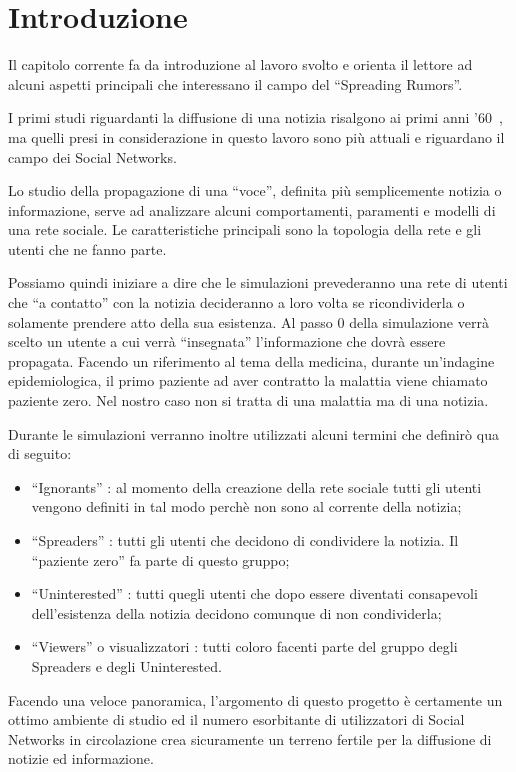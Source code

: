 \section{Introduzione}
\label{section:introduzione}

Il capitolo corrente fa da introduzione al lavoro svolto e orienta il lettore 
ad alcuni aspetti principali che interessano il campo del ``Spreading Rumors''.

I primi studi riguardanti la diffusione di una notizia risalgono ai primi anni '60~\cite{biblio:stochastic_rumours}, 
ma quelli presi in considerazione in questo lavoro sono più attuali e riguardano il campo dei Social Networks.

Lo studio della propagazione di una ``voce'', definita più semplicemente notizia o informazione, 
serve ad analizzare alcuni comportamenti, paramenti e modelli di una rete sociale.
Le caratteristiche principali sono la topologia della rete e gli utenti che ne fanno parte.

Possiamo quindi iniziare a dire che le simulazioni prevederanno una rete di utenti che ``a contatto'' con
la notizia decideranno a loro volta se ricondividerla o solamente prendere atto della sua esistenza.
Al passo 0 della simulazione verrà scelto un utente a cui verrà ``insegnata'' l'informazione 
che dovrà essere propagata. 
Facendo un riferimento al tema della medicina, durante un'indagine epidemiologica, il primo paziente ad aver 
contratto la malattia viene chiamato paziente zero.
Nel nostro caso non si tratta di una malattia ma di una notizia.

Durante le simulazioni verranno inoltre utilizzati alcuni termini che definirò qua di seguito:
\begin{itemize}
 \item ``Ignorants'' : al momento della creazione della rete sociale tutti gli utenti vengono definiti 
 in tal modo perchè non sono al corrente della notizia;
 \item ``Spreaders'' : tutti gli utenti che decidono di condividere la notizia. 
 Il ``paziente zero'' fa parte di questo gruppo;
 \item ``Uninterested'' : tutti quegli utenti che dopo essere diventati consapevoli dell'esistenza 
 della notizia decidono comunque di non condividerla;
 \item ``Viewers'' o visualizzatori : tutti coloro facenti parte del gruppo degli Spreaders e degli Uninterested.
\end{itemize}

Facendo una veloce panoramica, l'argomento di questo progetto è certamente un ottimo ambiente di studio
ed il numero esorbitante di utilizzatori di Social Networks in circolazione crea sicuramente 
un terreno fertile per la diffusione di notizie ed informazione.




